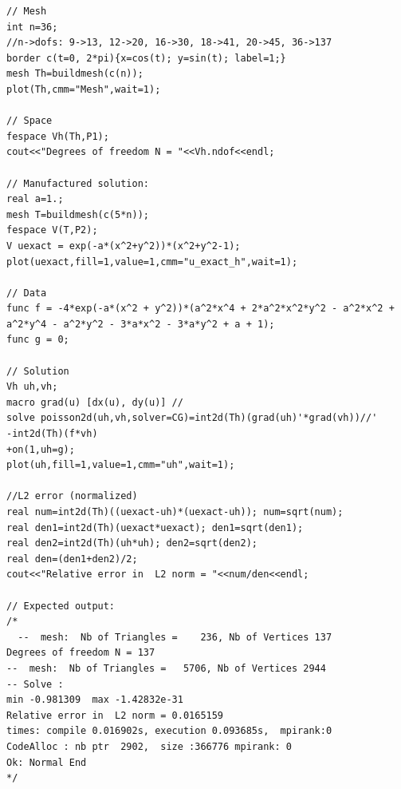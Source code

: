 \documentclass[12pt, a4paper]{report}
\theoremstyle{definition}
\begin{document}
{\begin{lstlisting}[language=FreeFem++, frame=single, name=extimate_dof, showstringspaces=false]
// Mesh
int n=36; 
//n->dofs: 9->13, 12->20, 16->30, 18->41, 20->45, 36->137
border c(t=0, 2*pi){x=cos(t); y=sin(t); label=1;}
mesh Th=buildmesh(c(n));
plot(Th,cmm="Mesh",wait=1);

// Space
fespace Vh(Th,P1);
cout<<"Degrees of freedom N = "<<Vh.ndof<<endl;

// Manufactured solution:
real a=1.;
mesh T=buildmesh(c(5*n));
fespace V(T,P2);
V uexact = exp(-a*(x^2+y^2))*(x^2+y^2-1);
plot(uexact,fill=1,value=1,cmm="u_exact_h",wait=1);

// Data
func f = -4*exp(-a*(x^2 + y^2))*(a^2*x^4 + 2*a^2*x^2*y^2 - a^2*x^2 + a^2*y^4 - a^2*y^2 - 3*a*x^2 - 3*a*y^2 + a + 1);
func g = 0;

// Solution
Vh uh,vh;
macro grad(u) [dx(u), dy(u)] //
solve poisson2d(uh,vh,solver=CG)=int2d(Th)(grad(uh)'*grad(vh))//'
-int2d(Th)(f*vh)
+on(1,uh=g);
plot(uh,fill=1,value=1,cmm="uh",wait=1);

//L2 error (normalized)
real num=int2d(Th)((uexact-uh)*(uexact-uh)); num=sqrt(num);
real den1=int2d(Th)(uexact*uexact); den1=sqrt(den1);
real den2=int2d(Th)(uh*uh); den2=sqrt(den2);
real den=(den1+den2)/2;
cout<<"Relative error in  L2 norm = "<<num/den<<endl;

// Expected output:
/*
  --  mesh:  Nb of Triangles =    236, Nb of Vertices 137
Degrees of freedom N = 137
--  mesh:  Nb of Triangles =   5706, Nb of Vertices 2944
-- Solve : 
min -0.981309  max -1.42832e-31
Relative error in  L2 norm = 0.0165159
times: compile 0.016902s, execution 0.093685s,  mpirank:0
CodeAlloc : nb ptr  2902,  size :366776 mpirank: 0
Ok: Normal End
*/

\end{lstlisting}





\newpage
\begin{thebibliography}{10}
	

\end{thebibliography}}
\end{document}
